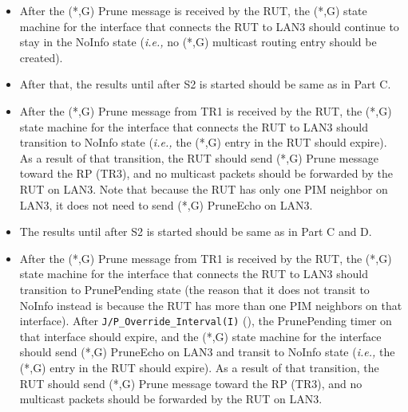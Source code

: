 \documentclass[11pt]{report}
\newcommand{\ie}{\emph{i.e.,}\xspace}
\begin{document}

\begin{itemize}

  \item After the (*,G) Prune message is received by the RUT,
  the (*,G) state machine for the interface that connects the RUT to
  LAN3 should continue to stay in the NoInfo state (\ie no (*,G) multicast
  routing entry should be created).

  \item After that, the results until after S2 is started should be same as in
  Part C.

  \item After the (*,G) Prune message from TR1 is received by the RUT,
  the (*,G) state machine for the interface that connects the RUT to
  LAN3 should transition to NoInfo state
  (\ie the (*,G) entry in the RUT should expire).
  As a result of that transition, the RUT should send (*,G) Prune
  message toward the RP (TR3), and no multicast packets should be
  forwarded by the RUT on LAN3. Note that because the RUT has only one
  PIM neighbor on LAN3, it does not need to send (*,G) PruneEcho on
  LAN3.

\end{itemize}


\begin{itemize}

  \item The results until after S2 is started should be same as in
  Part C and D.

  \item After the (*,G) Prune message from TR1 is received by the RUT,
  the (*,G) state machine for the interface that connects the RUT to
  LAN3 should transition to PrunePending state (the reason that it does
  not transit to NoInfo instead is because the RUT has more than one PIM
  neighbors on that interface).
  After \verb=J/P_Override_Interval(I)= (\PimsmJPOverrideIntervalI),
  the PrunePending timer on that interface should expire, and the
  (*,G) state machine for the interface should send (*,G) PruneEcho
  on LAN3 and transit to NoInfo
  state (\ie the (*,G) entry in the RUT should expire).
  As a result of that transition, the RUT should send (*,G) Prune
  message toward the RP (TR3), and no multicast packets should be
  forwarded by the RUT on LAN3.

\end{itemize}
\end{document}
